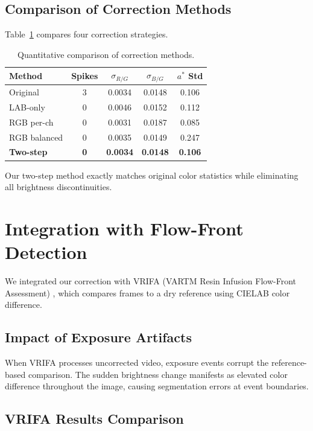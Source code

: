 \documentclass[conference]{IEEEtran}
\begin{document}
\subsection{Comparison of Correction Methods}

Table~\ref{tab:method_comparison} compares four correction strategies.

\begin{table}[t]
\centering
\caption{Quantitative comparison of correction methods.}
\label{tab:method_comparison}
\begin{tabular}{lcccc}
\toprule
\textbf{Method} & \textbf{Spikes} & \textbf{$\sigma_{R/G}$} & \textbf{$\sigma_{B/G}$} & \textbf{$a^*$ Std} \\
\midrule
Original & 3 & 0.0034 & 0.0148 & 0.106 \\
LAB-only & 0 & 0.0046 & 0.0152 & 0.112 \\
RGB per-ch & 0 & 0.0031 & 0.0187 & 0.085 \\
RGB balanced & 0 & 0.0035 & 0.0149 & 0.247 \\
\textbf{Two-step} & \textbf{0} & \textbf{0.0034} & \textbf{0.0148} & \textbf{0.106} \\
\bottomrule
\end{tabular}
\end{table}

Our two-step method exactly matches original color statistics while eliminating all brightness discontinuities.

\section{Integration with Flow-Front Detection}
\label{sec:integration}

We integrated our correction with VRIFA (VARTM Resin Infusion Flow-Front Assessment) \cite{vrifa}, which compares frames to a dry reference using CIELAB color difference.

\subsection{Impact of Exposure Artifacts}

When VRIFA processes uncorrected video, exposure events corrupt the reference-based comparison. The sudden brightness change manifests as elevated color difference throughout the image, causing segmentation errors at event boundaries.

\subsection{VRIFA Results Comparison}
\end{document}
